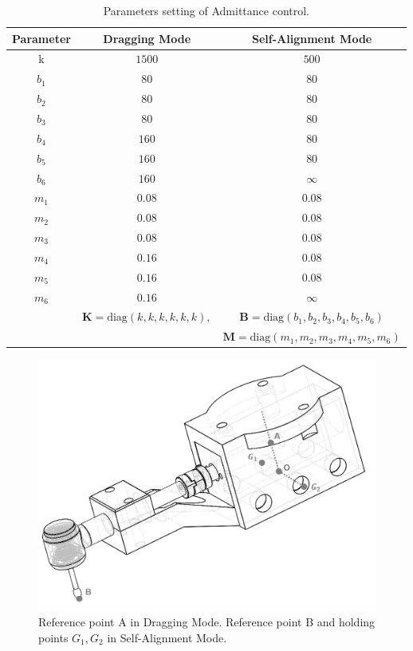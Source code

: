 \begin{table}[htbp]
\centering
\caption{Parameters setting of Admittance control.}
\label{tab: para_adm}
\begin{tabular}{ccc} 
\hline \hline
Parameter	&Dragging Mode		&Self-Alignment Mode	\\
\hline
k			&$1500$				&$500$				\\
$b_1$		&$80$				&$80$					\\
$b_2$		&$80$				&$80$					\\
$b_3$		&$80$				&$80$					\\
$b_4$		&$160$				&$80$					\\
$b_5$		&$160$				&$80$					\\
$b_6$		&$160$				&$\infty$					\\
$m_1$		&$0.08$				&$0.08$				\\
$m_2$		&$0.08$				&$0.08$				\\
$m_3$		&$0.08$				&$0.08$				\\
$m_4$		&$0.16$				&$0.08$				\\
$m_5$		&$0.16$				&$0.08$					\\
$m_6$		&$0.16$				&$\infty$		\\
\hline	
&$\mathbf{K} = \text{diag}(k,k,k,k,k,k),$ &$\mathbf{B} = \text{diag}(b_1,b_2,b_3,b_4,b_5,b_6)$\\
& &$\mathbf{M} = \text{diag}(	m_1,m_2,m_3,m_4,m_5,m_6)$\\
\hline\hline	
\end{tabular}
\end{table}
\begin{figure}[htbp]
\begin{center}
\includegraphics[width=0.7\linewidth]{Images/holding_gesture.png}
\caption{
Reference point A in Dragging Mode. Reference point B and holding points $G_1,G_2$ in Self-Alignment Mode.
}\label{fig:holding gesture}
\end{center}
\end{figure}
